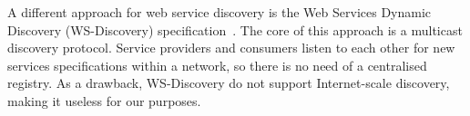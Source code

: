 A different approach for web service discovery is the Web Services Dynamic Discovery (WS-Discovery) specification~\cite{beatty2005}. The core of this approach is a multicast discovery protocol. Service providers and consumers listen to each other for new services specifications within a network, so there is no need of a centralised registry. As a drawback, WS-Discovery do not support Internet-scale discovery, making it useless for our purposes.
